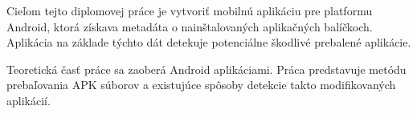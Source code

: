 Cieľom tejto diplomovej práce je vytvoriť mobilnú aplikáciu pre platformu Android, ktorá získava metadáta o nainštalovaných aplikačných balíčkoch. Aplikácia na základe týchto dát detekuje potenciálne škodlivé prebalené aplikácie. 

\noindent Teoretická časť práce sa zaoberá Android aplikáciami. Práca predstavuje metódu prebaľovania APK súborov a existujúce spôsoby detekcie takto modifikovaných aplikácií.

